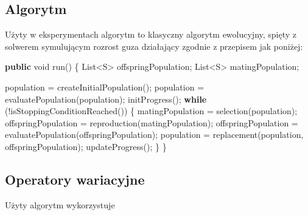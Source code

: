 \documentclass[]{article}
\newenvironment{Shaded}{}{}
\newcommand{\KeywordTok}[1]{\textcolor[rgb]{0.00,0.44,0.13}{\textbf{{#1}}}}
\newcommand{\DataTypeTok}[1]{\textcolor[rgb]{0.56,0.13,0.00}{{#1}}}
\newcommand{\FunctionTok}[1]{\textcolor[rgb]{0.02,0.16,0.49}{{#1}}}
\newcommand{\NormalTok}[1]{{#1}}
\begin{document}
\label{sec:algorytm}

\subsection{Algorytm}\label{algorytm}

Użyty w eksperymentach algorytm to klasyczny algorytm ewolucyjny, spięty
z solwerem symulującym rozrost guza działający zgodnie z przepisem jak
poniżej:

\begin{Shaded}
\begin{Highlighting}[]
\KeywordTok{public} \DataTypeTok{void} \FunctionTok{run}\NormalTok{() \{}
    \NormalTok{List<S> offspringPopulation;}
    \NormalTok{List<S> matingPopulation;}

    \NormalTok{population = }\FunctionTok{createInitialPopulation}\NormalTok{();}
    \NormalTok{population = }\FunctionTok{evaluatePopulation}\NormalTok{(population);}
    \FunctionTok{initProgress}\NormalTok{();}
    \KeywordTok{while} \NormalTok{(!}\FunctionTok{isStoppingConditionReached}\NormalTok{()) \{}
      \NormalTok{matingPopulation = }\FunctionTok{selection}\NormalTok{(population);}
      \NormalTok{offspringPopulation = }\FunctionTok{reproduction}\NormalTok{(matingPopulation);}
      \NormalTok{offspringPopulation = }\FunctionTok{evaluatePopulation}\NormalTok{(offspringPopulation);}
      \NormalTok{population = }\FunctionTok{replacement}\NormalTok{(population, offspringPopulation);}
      \FunctionTok{updateProgress}\NormalTok{();}
    \NormalTok{\}}
\NormalTok{\}}
\end{Highlighting}
\end{Shaded}

\subsection{Operatory wariacyjne}\label{operatory-wariacyjne}

Użyty algorytm wykorzystuje
\end{document}
